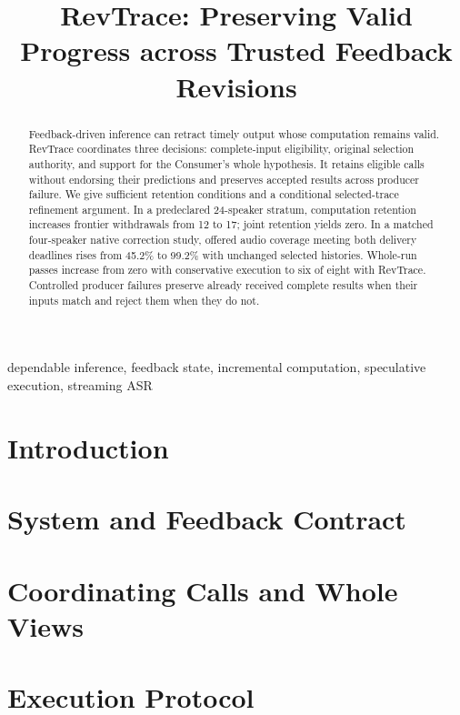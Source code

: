 \documentclass[conference,10pt]{IEEEtran}
\begin{document}
\title{RevTrace: Preserving Valid Progress across Trusted Feedback Revisions}
\author{}
\maketitle
\begin{abstract}
Feedback-driven inference can retract timely output whose computation
remains valid. RevTrace coordinates three decisions: complete-input
eligibility, original selection authority, and support for the Consumer's
whole hypothesis. It retains eligible calls without endorsing their
predictions and preserves accepted results across producer failure.
We give sufficient retention conditions and a conditional selected-trace
refinement argument. In a predeclared 24-speaker stratum, computation
retention increases frontier withdrawals from 12 to 17; joint retention
yields zero. In a matched four-speaker native correction study, offered
audio coverage meeting both delivery deadlines rises from 45.2\% to
99.2\% with unchanged selected histories. Whole-run passes increase from
zero with conservative execution to six of eight with RevTrace.
Controlled producer failures preserve already received complete results
when their inputs match and reject them when they do not.
\end{abstract}
\begin{IEEEkeywords}
dependable inference, feedback state, incremental computation, speculative execution, streaming ASR
\end{IEEEkeywords}
\section{Introduction}\label{sec:intro}

\section{System and Feedback Contract}\label{sec:contract}

\section{Coordinating Calls and Whole Views}\label{sec:continuation}





\section{Execution Protocol}\label{sec:protocol}


\end{document}
